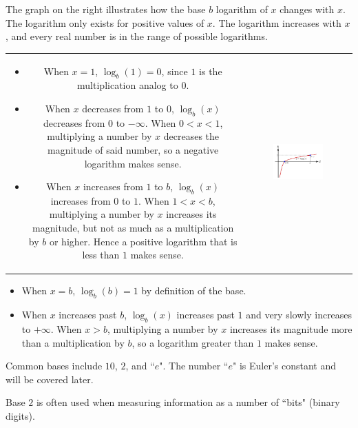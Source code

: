 \documentclass{article}
\begin{document}
The graph on the right illustrates how the base \(b\) logarithm of \(x\) changes with \(x\). The logarithm only exists for positive values of \(x\). The logarithm increases with \(x\), and every real number is in the range of possible logarithms. 

\begin{tabular}{cc}
\parbox{0.5\textwidth}{
\begin{itemize}
\item When \(x = 1\), \(\log_b(1) = 0\), since \(1\) is the multiplication analog to \(0\).
\item When \(x\) decreases from \(1\) to \(0\), \(\log_b(x)\) decreases from \(0\) to \(-\infty\). When \(0 < x < 1\), multiplying a number by \(x\) decreases the magnitude of said number, so a negative logarithm makes sense. 
\item When \(x\) increases from \(1\) to \(b\), \(\log_b(x)\) increases from \(0\) to \(1\). When \(1 < x < b\), multiplying a number by \(x\) increases its magnitude, but not as much as a multiplication by \(b\) or higher. Hence a positive logarithm that is less than \(1\) makes sense. 
\end{itemize}
} & \parbox{0.5\textwidth}{
\includegraphics[width = 0.5\textwidth]{logarithm_graph}
}
\end{tabular}
\begin{itemize}
\item When \(x = b\), \(\log_b(b) = 1\) by definition of the base.
\item When \(x\) increases past \(b\), \(\log_b(x)\) increases past \(1\) and very slowly increases to \(+\infty\). When \(x > b\), multiplying a number by \(x\) increases its magnitude more than a multiplication by \(b\), so a logarithm greater than \(1\) makes sense.
\end{itemize}

Common bases include \(10\), \(2\), and ``\(e\)". The number ``\(e\)" is Euler's constant and will be covered later.

Base \(2\) is often used when measuring information as a number of ``bits" (binary digits).
\end{document}
